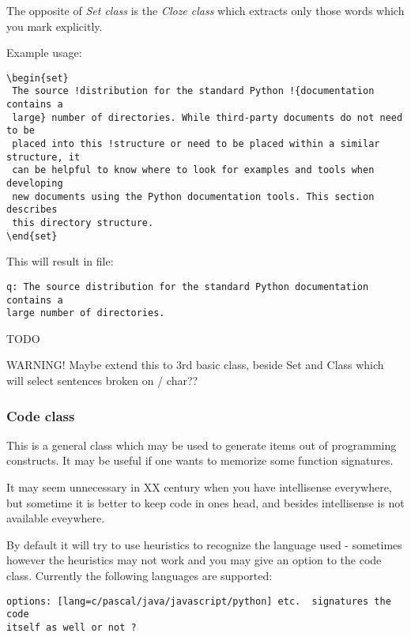 \documentclass[a4paper,11pt]{article}
\begin{document}
The opposite of \emph{Set class} is the \emph{Cloze class} which extracts only
those words which you mark explicitly.


Example usage:
\begin{verbatim}
\begin{set}
 The source !distribution for the standard Python !{documentation contains a
 large} number of directories. While third-party documents do not need to be
 placed into this !structure or need to be placed within a similar structure, it
 can be helpful to know where to look for examples and tools when developing
 new documents using the Python documentation tools. This section describes
 this directory structure.
\end{set}
\end{verbatim}

This will result in file:

\begin{verbatim}
q: The source distribution for the standard Python documentation contains a
large number of directories.

\end{verbatim}

TODO

WARNING!
Maybe extend this to 3rd basic class, beside Set and Class which will select
sentences broken on / char??





\subsubsection{Code class}

This is a general class which may be used to generate items out of programming
constructs. It may be useful if one wants to memorize some function signatures.

It may seem unnecessary in XX century when you have intellisense everywhere,
but sometime it is better to keep code in ones head, and besides intellisense
is not available eveywhere.

By default it will try to use heuristics to recognize the language used -
sometimes however the heuristics may not work and you may give an option to the
code class.  Currently the following languages are supported:

\begin{verbatim}
options: [lang=c/pascal/java/javascript/python] etc.  signatures the code
itself as well or not ?
\end{verbatim}
\end{document}
